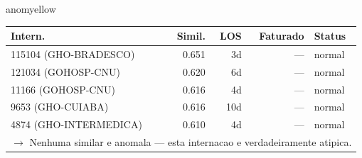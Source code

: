 \documentclass[a4paper,10pt]{article}
\begin{document}
\begin{anomalycard}[Internacao 82080 | GHO-PETROBRAS | MODERADO (z=2.02)]{anomyellow}
\begin{tabular}{l r r r l}\toprule\textbf{Intern.} & \textbf{Simil.} & \textbf{LOS} & \textbf{Faturado} & \textbf{Status} \\\midrule
115104 (GHO-BRADESCO) & 0.651 & 3d & --- & \textcolor{jcubeblue}{normal} \\
121034 (GOHOSP-CNU) & 0.620 & 6d & --- & \textcolor{jcubeblue}{normal} \\
11166 (GOHOSP-CNU) & 0.616 & 4d & --- & \textcolor{jcubeblue}{normal} \\
9653 (GHO-CUIABA) & 0.616 & 10d & --- & \textcolor{jcubeblue}{normal} \\
4874 (GHO-INTERMEDICA) & 0.610 & 4d & --- & \textcolor{jcubeblue}{normal} \\
\multicolumn{5}{l}{\textcolor{jcubeblue}{\small $\rightarrow$ Nenhuma similar e anomala --- esta internacao e verdadeiramente atipica.}} \\
\bottomrule\end{tabular}


\end{anomalycard}

\newpage
\end{document}
